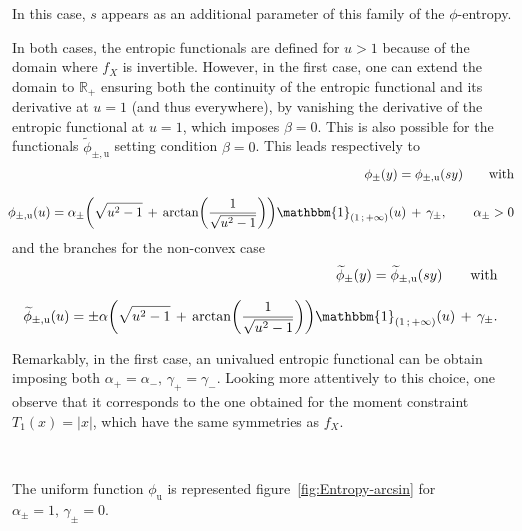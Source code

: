 \documentclass[entropy,article,submit,moreauthors,pdftex]{Definitions/mdpi}
\def\Rset{\mathbb{R}}%
\def\un{\mathbbm{1}}%
\def\u{\mathrm{u}}
\begin{document}
In this  case, $s$  appears as  an additional  parameter of  this family  of the
$\phi$-entropy.

In both cases, the  entropic functionals are defined for $u >  1$ because of the
domain where $f_X$ is invertible. However, in the first case, one can extend the
domain to $\Rset_+$ ensuring both the  continuity of the entropic functional and
its derivative at $u = 1$ (and  thus everywhere), by vanishing the derivative of
the entropic  functional at $u =  1$, which imposes  $\beta = 0$.  This  is also
possible  for  the  functionals  $\widetilde{\phi}_{\pm,\u}$  setting  condition
$\beta = 0$.  This leads respectively to
%
\begin{eqnarray*}
  &&\hspace{-5mm}\phi_\pm(y) =  \phi_{\pm,\u}(s y) \qquad  \mbox{with}
  \\[2.5mm]
  &&\hspace{-5mm}\phi_{\pm,\u}(u) = \alpha_\pm \left( \sqrt{u^2 - 1} \, + \,
  \arctan\left( \frac{1}{\sqrt{u^2 - 1}} \right) \right) \un_{\left( 1 \, ; \,
    +\infty \right)}(u) \, + \, \gamma_\pm, \qquad \alpha_\pm > 0
\end{eqnarray*}
%
and the branches for the non-convex case
%
\begin{eqnarray*}
  &&\hspace{-5mm}\widetilde{\phi}_\pm(y) = \widetilde{\phi}_{\pm,\u}(s y) \qquad
  \mbox{with}
  \\[2.5mm]
  &&\hspace{-5mm} \widetilde{\phi}_{\pm,\u}(u) = \pm \alpha \left( \sqrt{u^2 -
    1} \, + \, \arctan\left( \frac{1}{\sqrt{u^2 - 1}} \right) \right)
  \un_{\left( 1 \, ; \, +\infty \right)}(u) \, + \, \gamma_\pm.
\end{eqnarray*}

Remarkably, in  the first case, an  univalued entropic functional can  be obtain
imposing  both $\alpha_+  = \alpha_-,  \,  \gamma_+ =  \gamma_-$.  Looking  more
attentively to this choice, one observe  that it corresponds to the one obtained
for the  moment constraint  $T_1(x) =  |x|$, which have  the same  symmetries as
$f_X$.

\

The  uniform function  $\phi_\u$ is  represented figure~\ref{fig:Entropy-arcsin}
for $\alpha_\pm = 1, \, \gamma_\pm = 0$.
 
\end{document}
